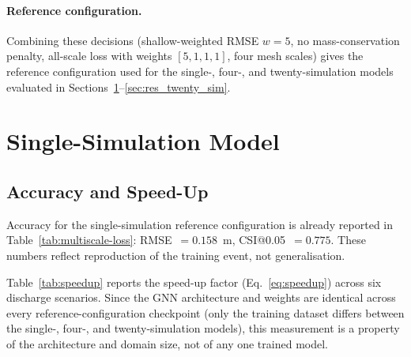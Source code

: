 \documentclass[12pt,a4paper]{report}
\begin{document}
{\paragraph{Reference configuration.}
Combining these decisions (shallow-weighted RMSE $w=5$, no mass-conservation penalty,
all-scale loss with weights $[5,1,1,1]$, four mesh scales) gives the reference
configuration used for the single-, four-, and twenty-simulation models evaluated in
Sections~\ref{sec:res_single_sim}--\ref{sec:res_twenty_sim}.
 
 
\section{Single-Simulation Model}
\label{sec:res_single_sim}
 
\subsection{Accuracy and Speed-Up}
\label{subsec:res_single_sim_accuracy}
 
Accuracy for the single-simulation reference configuration is already reported in
Table~\ref{tab:multiscale-loss}: RMSE~$=0.158$~m, CSI@0.05~$=0.775$. These numbers reflect reproduction of the training event, not generalisation.
 
Table~\ref{tab:speedup} reports the speed-up factor (Eq.~\ref{eq:speedup}) across six
discharge scenarios. Since the GNN architecture and weights are identical across every
reference-configuration checkpoint (only the training dataset differs between the
single-, four-, and twenty-simulation models), this measurement is a property of the
architecture and domain size, not of any one trained model.
 
}
\end{document}
